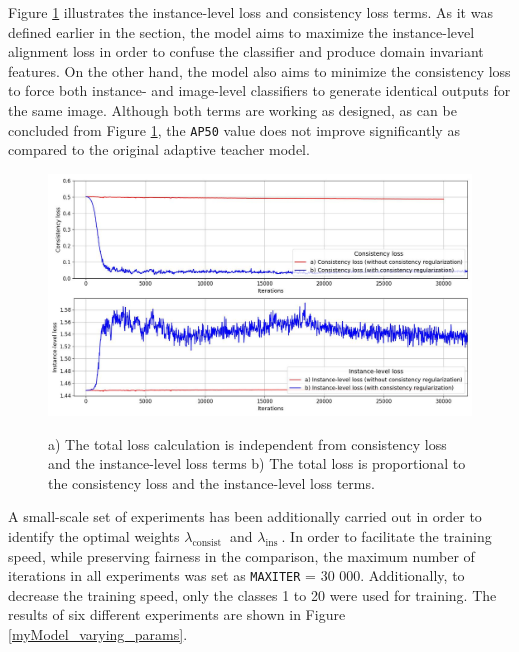 Figure \ref{myModel_constloss_total} illustrates the instance-level loss and consistency loss terms. As it was defined earlier in the  section, the model aims to maximize the instance-level alignment loss in order to confuse the classifier and produce domain invariant features. On the other hand, the model also aims to minimize the consistency loss to force both instance- and image-level classifiers to generate identical outputs for the same image. Although both terms are working as designed, as can be concluded from Figure \ref{myModel_constloss_total}, the \texttt{AP50} value does not improve significantly as compared to the original adaptive teacher model. 

\begin{figure}[htb]
	\begin{center}
		\includegraphics[width=14cm]{./consistency_loss.jpg}
	\end{center}
	\caption{a) The total loss calculation is independent from consistency loss and the instance-level loss terms b) The total loss is proportional to the consistency loss and the instance-level loss terms.}
	\begin{center}
		\label{myModel_constloss_total}
	\end{center}
\end{figure}
\FloatBarrier  

A small-scale set of experiments has been additionally carried out in order to identify the optimal weights $\lambda_{\text {consist }}$ and $\lambda_{\text {ins }}$. In order to facilitate the training speed, while preserving fairness in the  comparison, the maximum number of iterations in all experiments was set as \texttt{MAX\textunderscore ITER} = 30 000. Additionally, to decrease the training speed, only the classes 1 to 20 were used for training. The results of six different experiments are shown in Figure \ref{myModel_varying_params}.

